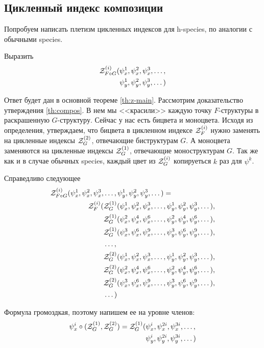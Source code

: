 \subsection{Цикленный индекс композиции}
Попробуем написать плетизм цикленных индексов для h-species,
по аналогии с обычными species.

\begin{problem}
Выразить
\begin{equation*}
\begin{split}
\mathcal Z^{(i)}_{F \circ G} (&\psi_x^1, \psi_x^2, \psi_x^3, \dots, \\
						&\psi_y^1, \psi_y^2, \psi_y^3, \dots)
\end{split}
\end{equation*}
\end{problem}
Ответ будет дан в основной теореме \ref{th:z-main}. Рассмотрим доказательство
утверждения \ref{th:compos}. В нем мы <<красили>> каждую точку $F$-структуры в раскрашенную $G$-структуру. Сейчас у нас есть
бицвета и моноцвета. Исходя из определения, утверждаем, что
бицвета в цикленном индексе $\mathcal Z^{(i)}_F$ нужно заменять на
цикленные индексы $\mathcal Z^{(2)}_G$, отвечающие биструктурам $G$. А моноцвета заменяются
на цикленные индексы $\mathcal Z^{(1)}_G$, отвечающие моноструктурам $G$. Так же как и в
случае обычных species, каждый цвет из $\mathcal Z^{(i)}_G$ копируеться $k$ раз для $\psi^k$. 

\begin{theorem}
Справедливо следующее
\label{th:z-main}
\begin{equation}
\begin{split}
\label{eq:h-zfg}
	\mathcal Z^{(i)}_{F \circ G} (\psi_x^1, \psi_x^2, \psi_x^3, &\dots, 
	\psi_y^1, \psi_y^2, \psi_y^3, \dots) = \\
	\mathcal Z_F^{(i)}(
		&\mathcal Z^{(1)}_G(\psi_x^1, \psi_x^2, \psi_x^3, \dots, 
					 \psi_y^1, \psi_y^2, \psi_y^3, \dots), \\
		&\mathcal Z^{(1)}_G(\psi_x^2, \psi_x^4, \psi_x^6, \dots, 
					 \psi_y^2, \psi_y^4, \psi_y^6, \dots), \\
		&\mathcal Z^{(1)}_G(\psi_x^3, \psi_x^6, \psi_x^9, \dots, 
					 \psi_y^3, \psi_y^6, \psi_y^9, \dots), \\
		&\dots, \\
		&\mathcal Z^{(2)}_G(\psi_x^1, \psi_x^2, \psi_x^3, \dots, 
					 \psi_y^1, \psi_y^2, \psi_y^3, \dots), \\
		&\mathcal Z^{(2)}_G(\psi_x^2, \psi_x^4, \psi_x^6, \dots, 
					 \psi_y^2, \psi_y^4, \psi_y^6, \dots), \\
		&\mathcal Z^{(2)}_G(\psi_x^3, \psi_x^6, \psi_x^9, \dots, 
					 \psi_y^3, \psi_y^6, \psi_y^9, \dots), \\
		&\dots
	)
\end{split}	
\end{equation}
\end{theorem}
Формула громоздкая, поэтому напишем ее на уровне членов:
\begin{equation*}
\begin{split}
\psi_x^i \circ (\mathcal Z^{(1)}_G, \mathcal Z^{(2)}_G ) = \mathcal Z^{(1)}_G
(&\psi_x^i, \psi_x^{2i}, \psi_x^{3i}, \dots, \\
&\psi_y^i, \psi_y^{2i}, \psi_y^{3i}, \dots)
\end{split}
\end{equation*}

